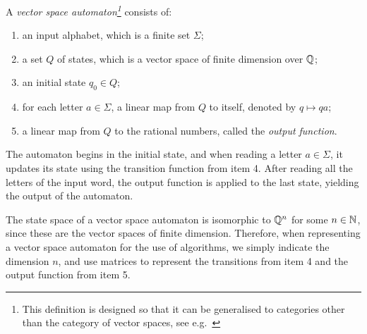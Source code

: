 \begin{definition}\label{def:vector-space-automaton} A  \emph{vector space automaton\footnote{This definition is designed so that it can be generalised to categories other than the category of vector spaces, see e.g.~\cite{Colcombet:2017is}}} consists of:
\begin{enumerate}
	\item an input alphabet, which is a finite set $\Sigma$;
	\item a set $Q$ of states, which is a vector space of finite dimension over $\mathbb Q$;
	\item an initial state $q_0 \in Q$;
	\item for each letter $a \in \Sigma$, a linear map from $Q$ to itself, denoted by  $q \mapsto qa$;
	\item a linear map from $Q$ to the rational numbers, called the \emph{output function}.
\end{enumerate}
The automaton begins in the initial state, and when reading a letter $a \in \Sigma$, it updates its state using the transition function from item 4. After reading all the letters of the input word, the output function is applied to the last state, yielding the output of the automaton.
\end{definition}

The state space of a vector space automaton is  isomorphic to $\mathbb Q^n$ for some $n \in \mathbb{N}$, since these are the vector spaces of finite dimension. Therefore, when representing a vector space automaton for the use of algorithms, we simply indicate the dimension $n$, and use matrices to represent the transitions from item 4 and the output function from item 5. 


